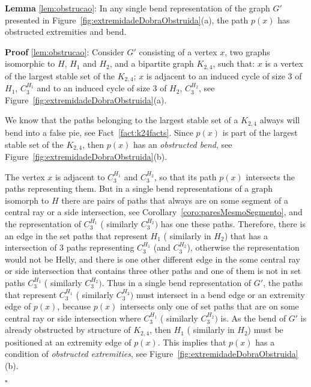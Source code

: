 \documentclass[9pt]{entcs}
\begin{document}
\begin{lema*}\textbf{Lemma} \ref{lem:obstrucao}:
In any single bend representation of the graph $G'$ presented in Figure~\ref{fig:extremidadeDobraObstruida}(a), the path $p(x)$ has obstructed extremities and bend.
\end{lema*}

\begin{prove*} \textbf{Proof} \ref{lem:obstrucao}:
Consider $G'$ consisting of a vertex $x$, two graphs isomorphic to $H$, $ H_1 $ and $ H_2 $, and a bipartite graph $K_{2,4}$, such that: $x$ is a vertex of the largest stable set of the $K_{2,4}$; $x$ is adjacent to an induced cycle of size 3 of $H_1$, $C_3^{H_1}$ and to an induced cycle of size 3 of $H_2$, $ C_3^{H_2}$, see Figure~\ref{fig:extremidadeDobraObstruida}(a).

We know that the paths belonging to the largest stable set of a $K_{2,4}$ always will bend into a false pie, see Fact~\ref{fact:k24facts}. Since $p(x)$ is part of the largest stable set of the $K_{2,4}$, then $p(x)$ has an \emph {obstructed bend}, see Figure~\ref{fig:extremidadeDobraObstruida}(b). 

The vertex $x$ is adjacent to $ C_{3}^{H_1}$ and $ C_3^{H_2}$, so that its path $ p(x) $ intersects the paths representing them.  But in a single bend representations of a graph isomorph to $H$ there are pairs of paths that always are on some segment of a central ray or a side intersection, see Corollary~\ref{coro:paresMesmoSegmento}, and the representation of $C_{3}^{H_1}$ ( similarly $C_3^{H_2})$ has one these paths. Therefore, there is an edge in the set paths that represent ${H_1}$ ( similarly in ${H_2}$) that has a intersection of 3 paths representing $ C_{3}^{H_1}$ (and $ C_3^{H_2}$), otherwise the representation would not be Helly, and there is one other different edge in the some central ray or side intersection that contains three other paths and one of them is not in set paths  $C_{3}^{H_1}$ ( similarly $C_3^{H_2})$. Thus in a single bend representation of $G'$, the paths that represent  $C_{3}^{H_1}$ ( similarly $C_3^{H_2})$ must intersect in a bend edge or an extremity edge of $p(x)$, because $p(x)$ intersects only one of set paths that are on some central ray or side intersection where  $C_{3}^{H_1}$ ( similarly $C_3^{H_2})$ is. As the bend of $G'$ is already obstructed by structure of $K_{2,4}$, then ${H_1}$ ( similarly in ${H_2}$) must be positioned at an extremity edge of $p(x)$. This implies that $ p(x) $ has a condition of \emph{obstructed extremities}, see Figure~\ref{fig:extremidadeDobraObstruida}(b).

$\square$ \end{prove*}
\end{document}
